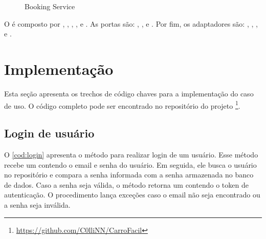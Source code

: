 \begin{figure}[H]
    \centering
    \caption{Booking Service}
    \label{fig:booking-service}
\end{figure}

O  é composto por , , , ,  e . As portas são: , ,  e . Por fim, os adaptadores são: , , ,  e .

\section{Implementação}
Esta seção apresenta os trechos de código chaves para a implementação do caso de uso. O código completo pode ser encontrado no repositório do projeto \footnote{\url{https://github.com/C0lliNN/CarroFacil}}.

\subsection{Login de usuário}
O \autoref{cod:login} apresenta o método para realizar login de um usuário. Esse método recebe um  contendo o email e senha do usuário. Em seguida, ele busca o usuário no repositório e compara a senha informada com a senha armazenada no banco de dados. Caso a senha seja válida, o método retorna um  contendo o token de autenticação. O procedimento lança exceções caso o email não seja encontrado ou a senha seja inválida.

